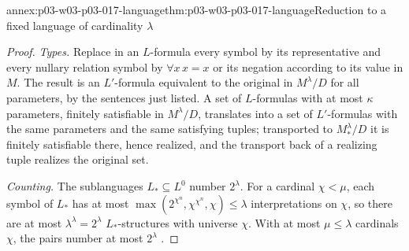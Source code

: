 \begin{annexitem}{annex:p03-w03-p03-017-language}{thm:p03-w03-p03-017-language}{Reduction to a fixed language of cardinality \(\lambda\)}
\begin{proof}
\emph{Types.}  Replace in an \(L\)-formula every symbol by its representative
and every nullary relation symbol by \(\forall x\,x=x\) or its negation
according to its value in \(M\).  The result is an \(L'\)-formula equivalent
to the original in \(M^\lambda/D\) for all parameters, by the sentences just
listed.  A set of \(L\)-formulas with at most \(\kappa\) parameters, finitely
satisfiable in \(M^\lambda/D\), translates into a set of \(L'\)-formulas with
the same parameters and the same satisfying tuples; transported to
\(M_*^\lambda/D\) it is finitely satisfiable there, hence realized, and the
transport back of a realizing tuple realizes the original set.

\emph{Counting.}  The sublanguages \(L_*\subseteq L^0\) number \(2^\lambda\).
For a cardinal \(\chi<\mu\), each symbol of \(L_*\) has at most
\(\max(2^{\chi^n},\chi^{\chi^n},\chi)\le\lambda\) interpretations on \(\chi\),
so there are at most \(\lambda^\lambda=2^\lambda\) \(L_*\)-structures with
universe \(\chi\).  With at most \(\mu\le\lambda\) cardinals \(\chi\), the pairs
number at most \(2^\lambda\) \cite[p.~230]{Shelah1971Ultrapowers}.
\end{proof}
\end{annexitem}

